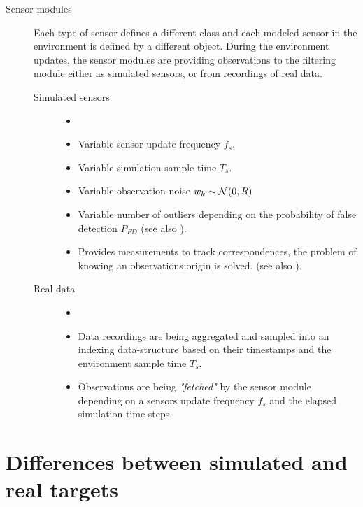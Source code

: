 \begin{description}
	\item[Sensor modules] Each type of sensor defines a different class and each modeled sensor in the environment is defined by a different object. During the environment updates, the sensor modules are providing observations to the filtering module either as simulated sensors, or from recordings of real data.
	\begin{description}
		\item[Simulated sensors]
		\begin{itemize}
			\item[]
			\item Variable sensor update frequency $f_s$.
			\item Variable simulation sample time $T_s$.
			\item Variable observation noise  ${w}_k \sim \mathcal{N}(0, {R})$
			\item Variable number of outliers depending on the probability of false detection $P_{FD}$ (see also ).
			\item Provides measurements to track correspondences, \ie the problem of knowing an observations origin is solved. (see also ).
		\end{itemize}
		\item[Real data]
				\begin{itemize}
					\item[]
					\item Data recordings are being aggregated and sampled into an indexing data-structure based on their timestamps and the environment sample time $T_s$.
					\item Observations are being \textit{"fetched"} by the sensor module depending on a sensors update frequency $f_s$ and the elapsed simulation time-steps.
				\end{itemize}
		
	\end{description}
\end{description}

	
	
\section{Differences between simulated and real targets}

